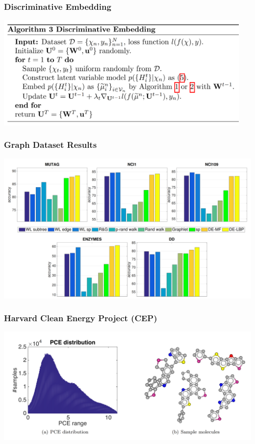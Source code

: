 \documentclass{beamer}
\begin{document}
    \begin{frame}
        \frametitle{Discriminative Embedding}
        \begin{center}
            \includegraphics[width=0.95\textwidth]{disc_embedding.png}
        \end{center}
    \end{frame}

    \begin{frame}
        \frametitle{Graph Dataset Results}
        \begin{center}
            \includegraphics[width=\textwidth]{graph_results.png}
        \end{center}
    \end{frame}

    \begin{frame}
        \frametitle{Harvard Clean Energy Project (CEP)}
        \begin{center}
            \includegraphics[width=\textwidth]{cep_data.png}
        \end{center}
    \end{frame}
\end{document}
